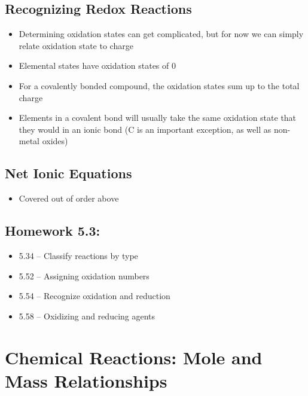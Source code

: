 \documentclass[12pt, openany, letterpaper]{memoir}
\begin{document}
\section{Recognizing Redox Reactions}
\begin{itemize}
	\item Determining oxidation states can get complicated, but for now we can simply relate oxidation state to charge
	\item Elemental states have oxidation states of 0
	\item For a covalently bonded compound, the oxidation states sum up to the total charge
	\item Elements in a covalent bond will usually take the same oxidation state that they would in an ionic bond (C is an important exception, as well as non-metal oxides)
\end{itemize}

\section{Net Ionic Equations}
\begin{itemize}
  \item Covered out of order above
\end{itemize}

\section*{Homework 5.3:}
\begin{itemize}
  \item 5.34 -- Classify reactions by type
  \item 5.52 -- Assigning oxidation numbers
  \item 5.54 -- Recognize oxidation and reduction
  \item 5.58 -- Oxidizing and reducing agents
\end{itemize}

\chapter{Chemical Reactions: Mole and Mass Relationships}
\end{document}
